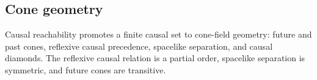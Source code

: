 \subsection{Cone geometry}

\begin{theorem}\label{thm:cone-field-geometry}\leanok{}
Causal reachability promotes a finite causal set to cone-field geometry:
future and past cones, reflexive causal precedence, spacelike separation, and
causal diamonds. The reflexive causal relation is a partial order, spacelike
separation is symmetric, and future cones are transitive.
\end{theorem}
